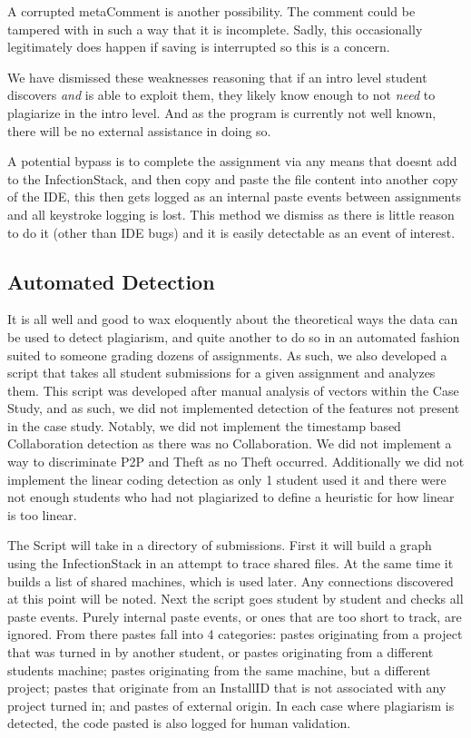 \documentclass[letterpaper,10pt,conference]{IEEEtran}
\newcommand{\installID}{InstallID\xspace}
\newcommand{\metaComment}{metaComment\xspace}
\newcommand{\infectionStack}{InfectionStack\xspace}
\begin{document}
A corrupted \metaComment is another possibility.  The comment could be tampered with in such a way that it is incomplete.  Sadly, this occasionally legitimately does happen if saving is interrupted so this is a concern.                     	

We have dismissed these weaknesses reasoning that if an intro level student discovers \textit{and} is able to exploit them, they likely know enough to not \textit{need} to plagiarize in the intro level.  And as the program is currently not well known, there will be no external assistance in doing so.

A potential bypass is to complete the assignment via any means that doesnt add to the \infectionStack, and then copy and paste the file content into another copy of the IDE, this then gets logged as an internal paste events between assignments and all keystroke logging is lost.  This method we dismiss as there is little reason to do it (other than IDE bugs) and it is easily detectable as an event of interest.
\subsection{Automated Detection}
It is all well and good to wax eloquently about the theoretical ways the data can be used to detect plagiarism, and quite another to do so in an automated fashion suited to someone grading dozens of assignments.  As such, we also developed a script that takes all student submissions for a given assignment and analyzes them.  This script was developed after manual analysis of vectors within the Case Study, and as such, we did not implemented detection of the features not present in the case study.  Notably, we did not implement the timestamp based Collaboration detection as there was no Collaboration.  We did not implement a way to discriminate P2P and Theft as no Theft occurred. Additionally we did not implement the linear coding detection as only 1 student used it and there were not enough students who had not plagiarized to define a heuristic for how linear is too linear.  

The Script will take in a directory of submissions.  First it will build a graph using the \infectionStack in an attempt to trace shared files.  At the same time it builds a list of shared machines, which is used later.  Any connections discovered at this point will be noted.  Next the script goes student by student and checks all paste events.  Purely internal paste events, or ones that are too short to track, are ignored.  From there pastes fall into 4 categories:  pastes originating from a project that was turned in by another student, or pastes originating from a different students machine; pastes originating from the same machine, but a different project; pastes that originate from an \installID that is not associated with any project turned in; and pastes of external origin.  In each case where plagiarism is detected, the code pasted is also logged for human validation.
\end{document}
